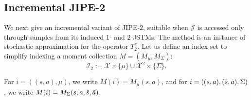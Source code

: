 \documentclass[accepted]{uai2026}
\theoremstyle{plain}
\theoremstyle{definition}
\theoremstyle{remark}
\newcommand{\X}{\mathcal{X}}
\newcommand{\1}{\mathbbm{1}}
\begin{document}
\subsection{Incremental JIPE-2}

We next give an incremental variant of JIPE-$2$, suitable when $\mathcal{J}$ is accessed only through samples from its induced $1$- and $2$-JSTMs. The method is an instance of stochastic approximation for the operator $T^\pi_2$. Let us define an index set to simplify indexing a moment collection $M = (M_\mu, M_\Sigma)$:
\begin{equation}
\mathcal{I}_2 := \X \times \{ \mu\}\cup \X^2 \times \{\Sigma\}.
\end{equation}

For $i = ((s, a), \mu)$, we write $M(i) = M_\mu(s, a)$, and for $i = ((s, a), (\Tilde{s}, \Tilde{a}), \Sigma)$, we write $M(i) = M_\Sigma(s, a, \Tilde{s}, \Tilde{a})$.
\end{document}
